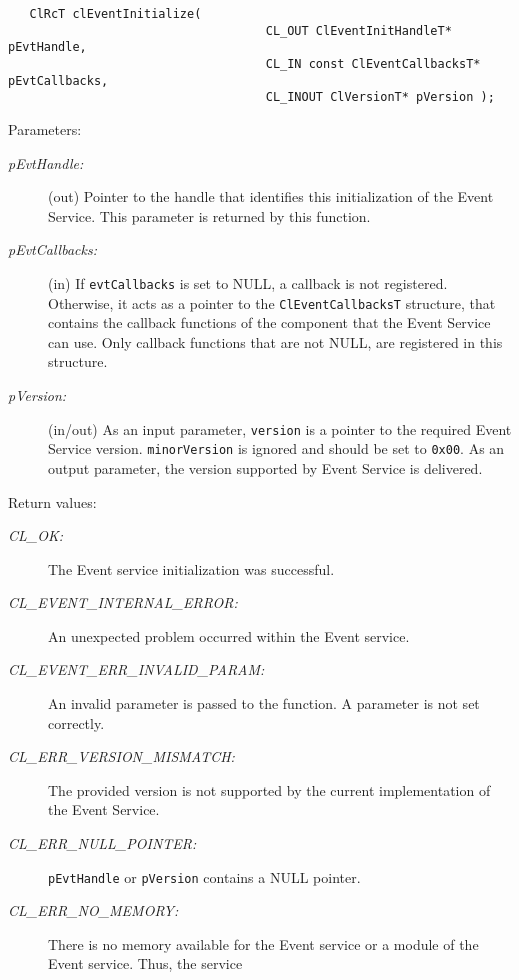 \begin{flushleft}
\begin{Desc}
\footnotesize\begin{verbatim}   ClRcT clEventInitialize(
              						CL_OUT ClEventInitHandleT* pEvtHandle,
					                CL_IN const ClEventCallbacksT* pEvtCallbacks,
              						CL_INOUT ClVersionT* pVersion );
\end{verbatim}
\normalsize
\end{Desc}
\begin{Desc}
\item[Parameters:]
\begin{description}
\item[{\em p\-Evt\-Handle:}](out) Pointer to the handle that identifies this initialization of the Event Service. This parameter is returned by this 
function.
\item[{\em p\-Evt\-Callbacks:}](in) If {\tt{evtCallbacks}} is set to NULL, a callback is not registered. Otherwise, it acts as a pointer to the 
{\tt{ClEventCallbacksT}} structure, that contains the callback functions of the component that the Event Service can use. Only callback functions that
are not NULL, are registered in this structure.
\item[{\em p\-Version:}](in/out) As an input parameter, {\tt{version}} is a pointer to the required Event Service version. {\tt{minorVersion}} is ignored
and should be set to {\tt{0x00}}. As an output parameter, the version supported by Event Service is delivered.
\end{description}
\end{Desc}
\begin{Desc}
\item[Return values:]
\begin{description}
\item[{\em CL\_\-OK:}]The Event service initialization was successful.
\item[{\em CL\_\-EVENT\_\-INTERNAL\_\-ERROR:}] An unexpected problem occurred within the Event service.
\item[{\em CL\_\-EVENT\_\-ERR\_\-INVALID\_\-PARAM:}]An invalid parameter is passed to the function. A parameter is not set correctly.
\item[{\em CL\_\-ERR\_\-VERSION\_\-MISMATCH:}]The provided version is not supported by the current implementation of the Event Service.
\item[{\em CL\_\-ERR\_\-NULL\_\-POINTER:}] {\tt{pEvtHandle}} or {\tt{pVersion}} contains a NULL pointer.
\item[{\em CL\_\-ERR\_\-NO\_\-MEMORY:}]There is no memory available for the Event service or a module of the Event service. Thus, the service

\end{description}
\end{Desc}
\end{flushleft}
